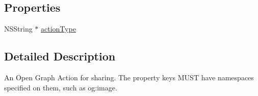\subsection*{Properties}
\begin{DoxyCompactItemize}
\item 
N\-S\-String $\ast$ \hyperlink{interface_f_b_s_d_k_share_open_graph_action_ae9d368ff0aa61e07a34cf9891244e0f9}{action\-Type}
\end{DoxyCompactItemize}


\subsection{Detailed Description}
An Open Graph Action for sharing.  The property keys M\-U\-S\-T have namespaces specified on them, such as {\ttfamily og\-:image}. 

